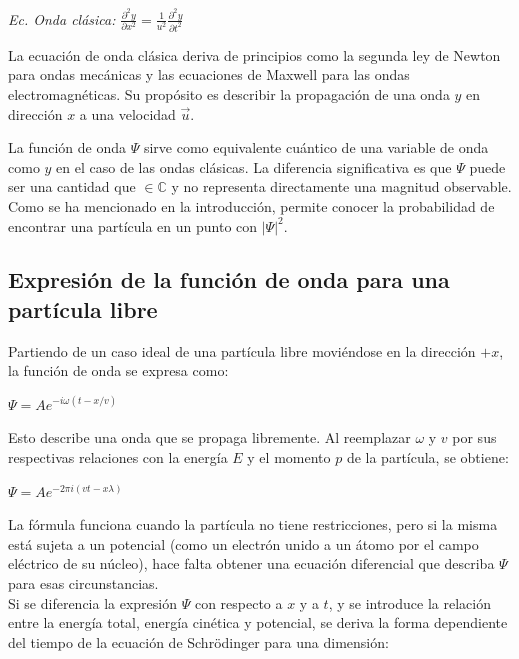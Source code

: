\documentclass[a4paper]{article}
\begin{document}
    \begin{center}
        \textit{Ec. Onda clásica:} \hspace{1cm} $\frac{\partial ^2 y}{\partial x^2} = \frac{1}{u^2} \frac{\partial ^2 y}{\partial t^2}$
    \end{center}

    \indent La ecuación de onda clásica deriva de principios como la segunda ley de Newton para ondas mecánicas y las ecuaciones de Maxwell para las ondas electromagnéticas. Su propósito es describir la propagación de una onda $y$ en dirección $x$ a una velocidad $\vec{u}$.


    \indent La función de onda $\Psi$ sirve como equivalente cuántico de una variable de onda como $y$ en el caso de las ondas clásicas. La diferencia significativa es que $\Psi$ puede ser una cantidad que $\in \mathbb{C}$ y no representa directamente una magnitud observable. Como se ha mencionado en la introducción, permite conocer la probabilidad de encontrar una partícula en un punto con $|\Psi|^2$. \\

    \subsection{Expresión de la función de onda para una partícula libre}
        \indent Partiendo de un caso ideal de una partícula libre moviéndose en la dirección $+x$, la función de onda se expresa como:

        \begin{center}
            $\Psi = Ae^{-i \omega (t-x/v)}$
        \end{center}

        \saltoPag

        Esto describe una onda que se propaga libremente. Al reemplazar $\omega$ y $v$ por sus respectivas relaciones con la energía $E$ y el momento $p$ de la partícula, se obtiene:

        \begin{center}
            $\Psi = Ae^{-2 \pi i (vt-x \lambda)}$ 
        \end{center}

        \indent La fórmula funciona cuando la partícula no tiene restricciones, pero si la misma está sujeta a un potencial (como un electrón unido a un átomo por el campo eléctrico de su núcleo), hace falta obtener una ecuación diferencial que describa $\Psi$ para esas circunstancias. \\
        \indent Si se diferencia la expresión $\Psi$ con respecto a $x$ y a $t$, y se introduce la relación entre la energía total, energía cinética y potencial, se deriva la forma dependiente del tiempo de la ecuación de Schrödinger para una dimensión: \\
\end{document}
